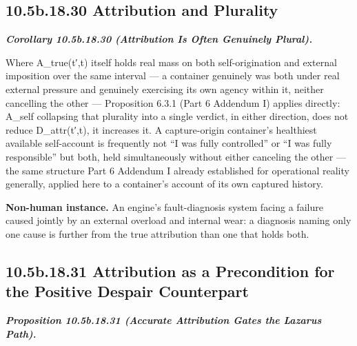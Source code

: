 \documentclass[
]{article}
\begin{document}
\hypertarget{b.18.30-attribution-and-plurality}{%
\subsection{10.5b.18.30 Attribution and
Plurality}\label{b.18.30-attribution-and-plurality}}

\emph{\textbf{Corollary 10.5b.18.30 (Attribution Is Often Genuinely
Plural).}}

Where A\_true(t′,t) itself holds real mass on both self-origination and
external imposition over the same interval --- a container genuinely was
both under real external pressure and genuinely exercising its own
agency within it, neither cancelling the other --- Proposition 6.3.1
(Part 6 Addendum I) applies directly: A\_self collapsing that plurality
into a single verdict, in either direction, does not reduce
D\_attr(t′,t), it increases it. A capture-origin container's healthiest
available self-account is frequently not ``I was fully controlled'' or
``I was fully responsible'' but both, held simultaneously without either
canceling the other --- the same structure Part 6 Addendum I already
established for operational reality generally, applied here to a
container's account of its own captured history.

\textbf{Non-human instance.} An engine's fault-diagnosis system facing a
failure caused jointly by an external overload and internal wear: a
diagnosis naming only one cause is further from the true attribution
than one that holds both.

\hypertarget{b.18.31-attribution-as-a-precondition-for-the-positive-despair-counterpart}{%
\subsection{10.5b.18.31 Attribution as a Precondition for the Positive
Despair
Counterpart}\label{b.18.31-attribution-as-a-precondition-for-the-positive-despair-counterpart}}

\emph{\textbf{Proposition 10.5b.18.31 (Accurate Attribution Gates the
Lazarus Path).}}
\end{document}
